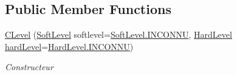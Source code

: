 \subsection*{Public Member Functions}
\begin{DoxyCompactItemize}
\item 
\mbox{\hyperlink{class_device_library_1_1_c_device_1_1_c_level_af8d6eec343773bf4581ecfc85fa2ff45}{C\+Level}} (\mbox{\hyperlink{class_device_library_1_1_c_device_1_1_c_level_a83c2976bc299331f1c355e806299bb1f}{Soft\+Level}} softlevel=\mbox{\hyperlink{class_device_library_1_1_c_device_1_1_c_level_a83c2976bc299331f1c355e806299bb1fab741d43a8209dcfcf03bb781061689a8}{Soft\+Level.\+I\+N\+C\+O\+N\+NU}}, \mbox{\hyperlink{class_device_library_1_1_c_device_1_1_c_level_a3f3169da53d5beebdac25e401982101a}{Hard\+Level}} \mbox{\hyperlink{class_device_library_1_1_c_device_1_1_c_level_ad1e4887c141b007c70d3dd0faa3a2d17}{hard\+Level}}=\mbox{\hyperlink{class_device_library_1_1_c_device_1_1_c_level_a3f3169da53d5beebdac25e401982101aab741d43a8209dcfcf03bb781061689a8}{Hard\+Level.\+I\+N\+C\+O\+N\+NU}})
\begin{DoxyCompactList}\small\item\em Constructeur \end{DoxyCompactList}\end{DoxyCompactItemize}
